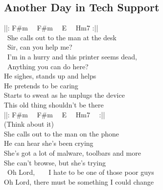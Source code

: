 \subsection{Another Day in Tech Support}

\textcolor{\chordcolor}{||: F\#m \ \ F\#m \ \ E \ \ Hm7 :||} \\

 \ She calls out to the man  at the desk  \\
 \ \glqq Sir, can you help  me? \\
 \ I'm in a hurry and this printer seems dead,  \\
 \ Anything you can do  here?\grqq \\

He sighes, stands up and helps \\
He pretends to be caring \\
Starts to sweat as he unplugs the device \\
This old thing shouldn't be there \\

\textcolor{\chordcolor}{||: F\#m \ \ F\#m \ \ E \ \ Hm7 \ \ :||} \\
(Think about it) \\

She calls out to the man on the phone \\
He can hear she's been crying \\
She's got a lot of malware, toolbars and more \\
She can't browse, but she's trying \\

 \ Oh Lord,\ \ \ \ I hate to be one of those poor guys \\
Oh Lord, there must be something I could change  \\

\pagebreak

